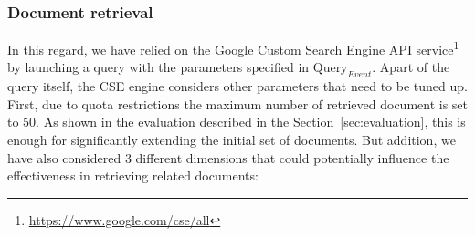 \documentclass{llncs}
\begin{document}
\subsubsection{Document retrieval}
In this regard, we have relied on the Google Custom Search Engine API service\footnote{\fontsize{8pt}{1em}\selectfont  \url{https://www.google.com/cse/all}} by launching a query with the parameters specified in $\text{Query}_{Event}$. Apart of the query itself, the CSE engine considers other parameters that need to be tuned up. First, due to quota restrictions the maximum number of retrieved document is set to 50. As shown in the evaluation described in the Section~\ref{sec:evaluation}, this is enough for significantly extending the initial set of documents. But addition, we have also considered 3 different dimensions that could potentially influence the effectiveness in retrieving related documents:
\end{document}
